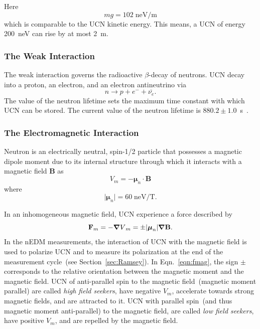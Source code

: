 Here
\begin{equation}
mg=102\; \text{neV/m}
\end{equation}
which is comparable to the UCN kinetic energy. This means, a UCN of
energy 200~neV can rise by at most 2~m.
\subsubsection{The Weak Interaction}
The weak interaction governs the radioactive $\beta$-decay of
neutrons. UCN decay into a proton, an electron, and an electron
antineutrino via
\label{neutrondecay}
\begin{equation}
n\longrightarrow p+e^{-}+\bar{\nu_{e}}.
\end{equation}
The value of the neutron lifetime sets the maximum time constant with
which UCN can be stored. The current value of the neutron lifetime is
$880.2 \pm 1.0$~s~\cite{PDG2018}.

\subsubsection{The Electromagnetic Interaction}

Neutron is an electrically neutral, spin-1/2 particle that possesses a
magnetic dipole moment due to its internal structure through which it
interacts with a magnetic field \textbf{B} as
\begin{equation}
  \label{eqn:vmag}
V_m=-\boldsymbol{\mu}_n \cdot \textbf{B}
\end{equation}
where
\begin{equation}
\vert \boldsymbol{\mu}_n \vert =60 \; \text{neV/T}.
\end{equation}

In an inhomogeneous magnetic field, UCN experience a force described
by
\begin{equation}
  \label{eqn:fmag}
  {\bf{F}}_m = - {\boldsymbol{\nabla}V}_m = \pm \vert {\boldsymbol{\mu}}_n \vert \boldsymbol{\nabla} \bf{B}.
\end{equation}
In the nEDM measurements, the interaction of UCN with the magnetic
field is used to polarize UCN and to measure its polarization at the
end of the measurement cycle~(see Section~\ref{sec:Ramsey}).  In
Eqn.~\ref{eqn:fmag}, the sign $\pm$ corresponds to the relative
orientation between the magnetic moment and the magnetic field.  UCN
of anti-parallel spin to the magnetic field~(magnetic moment parallel)
are called {\it{high field seekers}}, have negative $V_m$, accelerate
towards strong magnetic fields, and are attracted to it. UCN with
parallel spin~(and thus magnetic moment anti-parallel) to the magnetic
field, are called {\it{low field seekers}}, have positive $V_m$, and
are repelled by the magnetic field.

